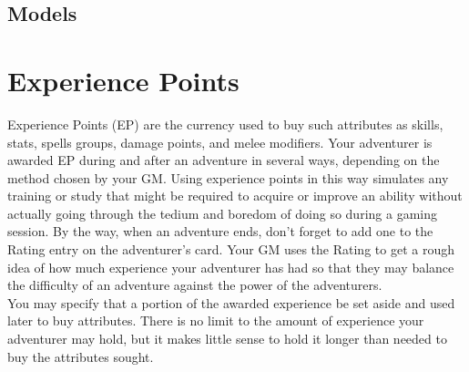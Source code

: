 \begin{multicols*}{2}
\subsection{Models}
\label{create-models}

\section{Experience Points}
Experience Points (EP) are the currency used to buy such attributes as skills, stats, spells groups, damage points, and melee modifiers. Your adventurer is awarded EP during and after an adventure in several ways, depending on the method chosen by your GM. Using experience points in this way simulates any training or study that might be required to acquire or improve an ability without actually going through the tedium and boredom of doing so during a gaming session. By the way, when an adventure ends, don't forget to add one to the Rating entry on the adventurer's card. Your GM uses the Rating to get a rough idea of how much experience your adventurer has had so that they may balance the difficulty of an adventure against the power of the adventurers.\\
You may specify that a portion of the awarded experience be set aside and used later to buy attributes. There is no limit to the amount of experience your adventurer may hold, but it makes little sense to hold it longer than needed to buy the attributes sought.

\end{multicols*}
